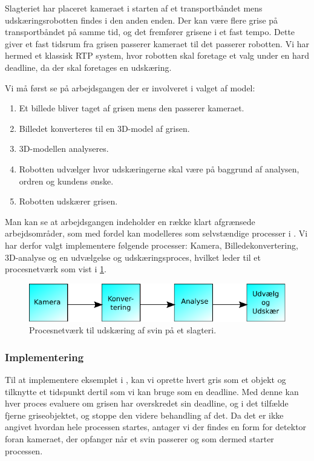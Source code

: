 Slagteriet har placeret kameraet i starten af et transportbåndet mens udskæringsrobotten findes i den anden enden. Der kan være flere grise på transportbåndet på samme tid, og det fremfører grisene i et fast tempo. Dette giver et fast tidsrum fra grisen passerer kameraet til det passerer robotten. Vi har hermed et klassisk RTP system, hvor robotten skal foretage et valg under en hard deadline, da der skal foretages en udskæring.

Vi må først se på arbejdsgangen der er involveret i valget af model:
\begin{enumerate}
\tightlist
	\item Et billede bliver taget af grisen mens den passerer kameraet.
	\item Billedet konverteres til en 3D-model af grisen.
	\item 3D-modellen analyseres.
	\item Robotten udvælger hvor udskæringerne skal være på baggrund af analysen, ordren og kundens ønske.
	\item Robotten udskærer grisen.
\end{enumerate}

Man kan se at arbejdsgangen indeholder en  række klart afgrænsede arbejdsområder, som med fordel kan modelleres som selvstændige processer i \pycsp.  Vi har derfor valgt implementere følgende processer: Kamera, Billedekonvertering, 3D-analyse og en udvælgelse og udskæringsproces, hvilket leder til et procesnetværk som vist i \cref{fig:pig-network}.

\begin{figure}
 \begin{center}
  \includegraphics[scale=1]{images/pig-network}
	\caption{Procesnetværk til udskæring af svin på et slagteri.}
	\label{fig:pig-network}
\end{center}
\end{figure}

\subsubsection*{Implementering}\label{sec:deadline-exampel-implementation}
Til at implementere eksemplet i \pycsp, kan vi oprette hvert gris som et objekt og tilknytte et tidspunkt dertil som vi kan bruge som en deadline. Med denne kan hver proces evaluere om grisen har overskredet sin deadline, og i det tilfælde fjerne griseobjektet, og stoppe den videre behandling af det. Da det er ikke angivet hvordan hele processen startes,  antager vi der findes en form for detektor foran kameraet, der opfanger når et svin passerer og som dermed starter processen. 

